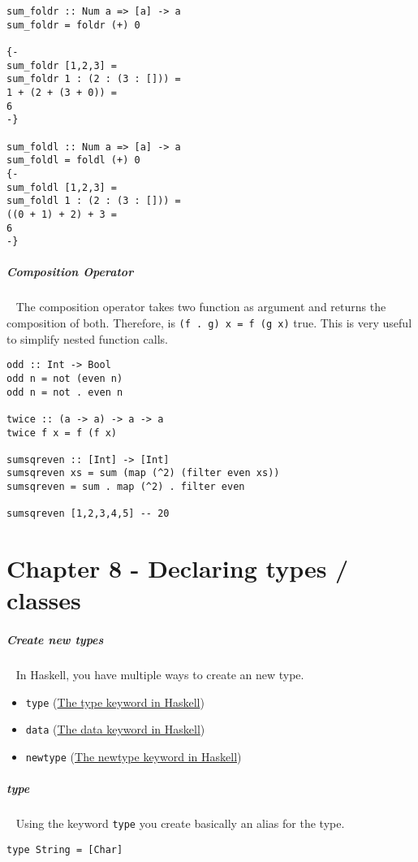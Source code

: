 \documentclass[11pt,twoside,landscape]{article}
\begin{document}
\begin{multicols}{3}
\begin{lstlisting}
sum_foldr :: Num a => [a] -> a
sum_foldr = foldr (+) 0

{-
sum_foldr [1,2,3] =
sum_foldr 1 : (2 : (3 : [])) = 
1 + (2 + (3 + 0)) = 
6
-}

sum_foldl :: Num a => [a] -> a
sum_foldl = foldl (+) 0
{-
sum_foldl [1,2,3] =
sum_foldl 1 : (2 : (3 : [])) = 
((0 + 1) + 2) + 3 =
6
-}
\end{lstlisting}




\subparagraph{Composition Operator} \
\label{sec:orgc94e9cc}
The composition operator takes two function as argument and returns the composition of both.
Therefore, is \texttt{(f . g) x = f (g x)} true.
This is very useful to simplify nested function calls.


\lstset{language=haskell,label= ,caption= ,captionpos=b,numbers=none}
\begin{lstlisting}
odd :: Int -> Bool
odd n = not (even n)
odd n = not . even n

twice :: (a -> a) -> a -> a
twice f x = f (f x)

sumsqreven :: [Int] -> [Int]
sumsqreven xs = sum (map (^2) (filter even xs))
sumsqreven = sum . map (^2) . filter even

sumsqreven [1,2,3,4,5] -- 20
\end{lstlisting}

\section{Chapter 8 - Declaring types / classes}
\label{sec:orgc4a8f81}
\subparagraph{Create new types} \
\label{sec:org0d323d8}
In Haskell, you have multiple ways to create an new type.
\begin{itemize}
\item \texttt{type} (\href{../../../roam/20220321113101-the_type_keyword_in_haskell.org}{The type keyword in Haskell})
\item \texttt{data} (\href{../../../roam/20220321113711-the_data_keyword_in_haskell.org}{The data keyword in Haskell})
\item \texttt{newtype} (\href{../../../roam/20220321114408-the_newtype_keyword_in_haskell.org}{The newtype keyword in Haskell})
\end{itemize}

\subparagraph{type} \
\label{sec:org656a0bf}
Using the keyword \texttt{type} you create basically an alias for the type.

\lstset{language=haskell,label= ,caption= ,captionpos=b,numbers=none}
\begin{lstlisting}
type String = [Char]
\end{lstlisting}


\end{multicols}
\end{document}
